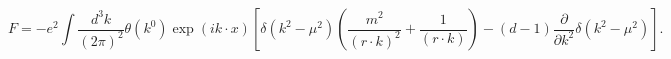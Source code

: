 \begin{equation}
F=-e^{2}\int\frac{d^{3}k}{(2\pi)^{2}}\theta(k^{0})\exp(ik\cdot x)[\delta
(k^{2}-\mu^{2})(\frac{m^{2}}{(r\cdot k)^{2}}+\frac{1}{(r\cdot k)}%
)-(d-1)\frac{\partial}{\partial k^{2}}\delta(k^{2}-\mu^{2})].{}%
\end{equation}

